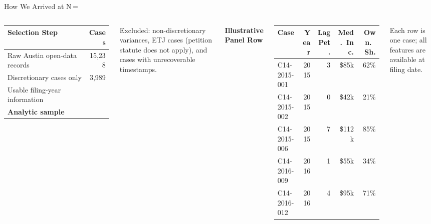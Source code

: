 \documentclass[10pt, aspectratio=169]{beamer}
\begin{document}
\begin{frame}{How We Arrived at N\,=\,\metricBaselineCases{}}
 \begin{columns}
 \small
 \begin{tabular}{lr}
 \toprule
 \textbf{Selection Step} & \textbf{Cases} \\
 \midrule
 Raw Austin open-data records & 15,238 \\
 Discretionary cases only & 3,989 \\
 Usable filing-year information & \metricBaselineCases{} \\
 \midrule
 \textbf{Analytic sample} & \textbf{\metricBaselineCases{}} \\
 \bottomrule
 \end{tabular}
 \vspace{0.8em}

 \footnotesize Excluded: non-discretionary variances, ETJ cases (petition statute does not apply), and cases with unrecoverable timestamps.

 \textbf{Illustrative Panel Row}
 \vspace{0.5em}
 \tiny
 \begin{tabular}{lrrrr}
 \toprule
 Case & Year & Lag Pet. & Med.\ Inc. & Own.\ Sh. \\
 \midrule
 C14-2015-001 & 2015 & 3 & \$85k & 62\% \\
 C14-2015-002 & 2015 & 0 & \$42k & 21\% \\
 C14-2015-006 & 2015 & 7 & \$112k & 85\% \\
 C14-2016-009 & 2016 & 1 & \$55k & 34\% \\
 C14-2016-012 & 2016 & 4 & \$95k & 71\% \\
 \bottomrule
 \end{tabular}
 \vspace{0.5em}

 \footnotesize Each row is one case; all features are available at filing date.
 \end{columns}
\end{frame}
\end{document}
